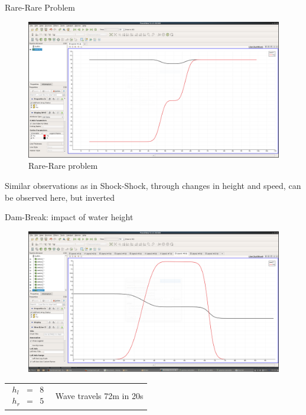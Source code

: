 \documentclass[shortpres]{beamer}
\newcommand{\imgvoffset}{-20pt}
\newcommand{\imgfullscale}{0.75}
\begin{document}
\begin{frame}{Rare-Rare Problem}
	\begin{figure}[t]
		\vspace{\imgvoffset}
		\includegraphics[clip, width=\imgfullscale\linewidth]{img/Rare-Rare.png}
		\caption*{Rare-Rare problem}
	\end{figure}
	Similar observations as in Shock-Shock, through changes in height and speed, can be observed here, but inverted
\end{frame}

\begin{frame}{Dam-Break: impact of water height}
	\begin{figure}[t]
		\vspace{\imgvoffset}
		\includegraphics[width=\imgfullscale\linewidth]{img/Dam_hl8_hr5.png}
		\caption*{}
	\end{figure}
	
	\begin{tabular}{m{3cm} m{\linewidth-5cm}}
		$
		\begin{matrix}
		h_l & = & 8\\
		h_r & = & 5
		\end{matrix}
		$
		&
		
		Wave travels 72m in 20s
	\end{tabular}
\end{frame}
\end{document}
